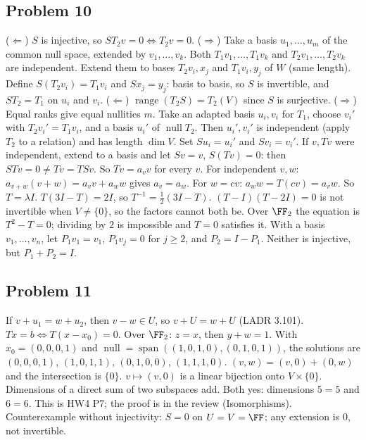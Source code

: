 \documentclass[11pt]{scrartcl}
\DeclareMathOperator{\nul}{null}
\DeclareMathOperator{\range}{range}
\DeclareMathOperator{\spn}{span}
\begin{document}
\subsection*{Problem 10}
\begin{enumerate}[(a)]
  \ii ($\Leftarrow$) $S$ is injective, so $ST_2v=0\iff T_2v=0$.
  ($\Rightarrow$) Take a basis $u_1,\dots,u_m$ of the common null space, extended by $v_1,\dots,v_k$.
  Both $T_1v_1,\dots,T_1v_k$ and $T_2v_1,\dots,T_2v_k$ are independent.
  Extend them to bases $T_2v_i,x_j$ and $T_1v_i,y_j$ of $W$ (same length).
  Define $S(T_2v_i)=T_1v_i$ and $Sx_j=y_j$: basis to basis, so $S$ is invertible, and $ST_2=T_1$ on $u_i$ and $v_i$.
  \ii ($\Leftarrow$) $\range(T_2S)=T_2(V)$ since $S$ is surjective.
  ($\Rightarrow$) Equal ranks give equal nullities $m$.
  Take an adapted basis $u_i,v_i$ for $T_1$, choose $v_i'$ with $T_2v_i'=T_1v_i$, and a basis $u_i'$ of $\nul T_2$.
  Then $u_i',v_i'$ is independent (apply $T_2$ to a relation) and has length $\dim V$.
  Set $Su_i=u_i'$ and $Sv_i=v_i'$.
  \ii If $v,Tv$ were independent, extend to a basis and let $Sv=v$, $S(Tv)=0$: then $STv=0\ne Tv=TSv$.
  So $Tv=a_vv$ for every $v$.
  For independent $v,w$: $a_{v+w}(v+w)=a_vv+a_ww$ gives $a_v=a_w$.
  For $w=cv$: $a_ww=T(cv)=a_vw$.
  So $T=\lambda I$.
  \ii $T(3I-T)=2I$, so $T^{-1}=\tfrac12(3I-T)$.
  $(T-I)(T-2I)=0$ is not invertible when $V\ne\{0\}$, so the factors cannot both be.
  Over $\FF_2$ the equation is $T^2-T=0$; dividing by $2$ is impossible and $T=0$ satisfies it.
  \ii With a basis $v_1,\dots,v_n$, let $P_1v_1=v_1$, $P_1v_j=0$ for $j\ge2$, and $P_2=I-P_1$.
  Neither is injective, but $P_1+P_2=I$.
\end{enumerate}

\subsection*{Problem 11}
\begin{enumerate}[(a)]
  \ii If $v+u_1=w+u_2$, then $v-w\in U$, so $v+U=w+U$ (LADR 3.101).
  \ii $Tx=b\iff T(x-x_0)=0$.
  Over $\FF_2$: $z=x$, then $y+w=1$. With $x_0=(0,0,0,1)$ and $\nul=\spn((1,0,1,0),(0,1,0,1))$, the solutions are
  $(0,0,0,1)$, $(1,0,1,1)$, $(0,1,0,0)$, $(1,1,1,0)$.
  \ii $(v,w)=(v,0)+(0,w)$ and the intersection is $\{0\}$.
  $v\mapsto(v,0)$ is a linear bijection onto $V\times\{0\}$.
  Dimensions of a direct sum of two subspaces add.
  \ii Both yes: dimensions $5=5$ and $6=6$.
  \ii This is HW4 P7; the proof is in the review (Isomorphisms). Counterexample without injectivity: $S=0$ on $U=V=\FF$; any extension is $0$, not invertible.
\end{enumerate}
\end{document}

